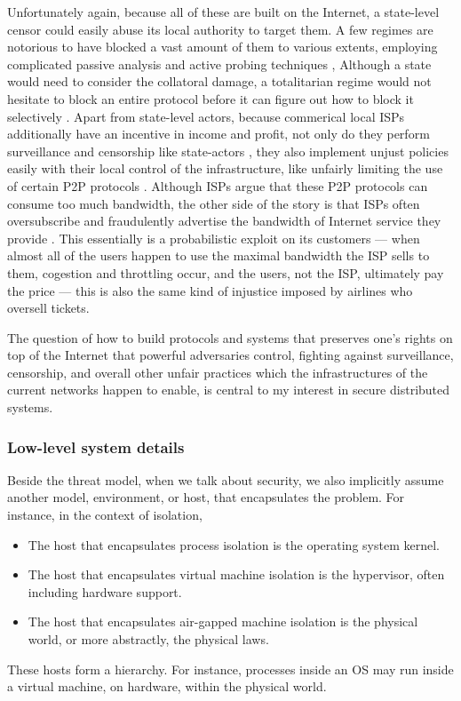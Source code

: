\documentclass{article}
\begin{document}
Unfortunately again, because all of these are built on the Internet, a
state-level censor could easily abuse its local authority to target them. A few
regimes are notorious to have blocked a vast amount of them to various
extents, employing complicated passive analysis and active probing techniques
\cite{censor.block.1, censor.block.2,censor.block.3, censor.block.4,
censor.block.5,censor.block.6},
Although a state would need to consider the collatoral damage, a totalitarian
regime would not hesitate to block an entire protocol before it can figure out
how to block it selectively \cite{selective.block.1, censor.block.4}. 
Apart from state-level actors, because commerical local ISPs additionally
have an incentive in income and profit, not only do they perform surveillance
and censorship like state-actors \cite{isp.statelike.actions.1,
isp.statelike.actions.2}, they also implement unjust policies easily with their
local control of the infrastructure, like unfairly limiting the use of certain
P2P protocols \cite{isp.block.p2p.1, isp.block.p2p.2, isp.block.p2p.3,
isp.statelike.actions.1}.  Although ISPs argue that these P2P protocols can
consume too much bandwidth, the other side of the story is that ISPs often
oversubscribe and fraudulently advertise the bandwidth of Internet service they
provide \cite{isp.oversubscribe.1, isp.oversubscribe.2}. This essentially is a
probabilistic exploit on its customers --- when almost all of the users happen
to use the maximal bandwidth the ISP sells to them, cogestion and throttling
occur, and the users, not the ISP, ultimately pay the price --- this is also
the same kind of injustice imposed by airlines who oversell tickets.

The question of how to build protocols and systems that preserves one's rights
on top of the Internet that powerful adversaries control, fighting against
surveillance, censorship, and overall other unfair practices which the
infrastructures of the current networks happen to enable, is central to my
interest in secure distributed systems.

\subsubsection{Low-level system details}
Beside the threat model, when we talk about security, we also implicitly assume
another model, environment, or host, that encapsulates the problem. For
instance, in the context of isolation, 
\begin{itemize}
	\item The host that encapsulates process isolation is the operating system
		kernel.
	\item The host that encapsulates virtual machine isolation is the
		hypervisor, often including hardware support.
	\item The host that encapsulates air-gapped machine isolation is the
		physical world, or more abstractly, the physical laws.
\end{itemize} 
These hosts form a hierarchy. For instance, processes inside an OS may run
inside a virtual machine, on hardware, within the physical world.
\end{document}
